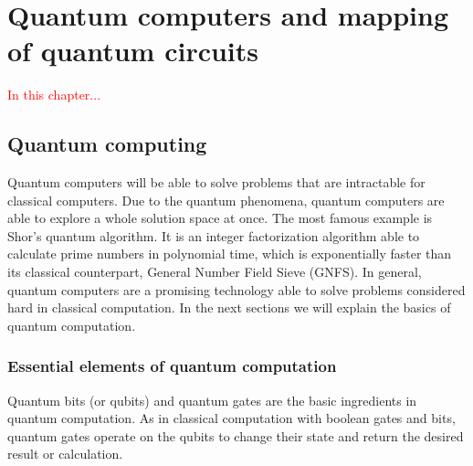 
\chapter{Quantum computers and mapping of quantum circuits}
\label{sec:org9b8733c}

\textcolor{red}{In this chapter...}


\section{Quantum computing}
\label{sec:org94895bc}

Quantum computers will be able to solve problems that are intractable for classical computers.
Due to the quantum phenomena, quantum computers are able to explore a whole solution space at once.
The most famous example is  Shor's quantum algorithm. It is an integer factorization algorithm able to calculate prime numbers in polynomial time, which is exponentially faster than its classical counterpart, General Number Field Sieve (GNFS). 
In general, quantum computers are a promising technology able to solve problems considered hard in classical computation.
In the next sections we will explain the basics of quantum computation.

\subsection{Essential elements of quantum computation}
\label{sec:orgba4af21}

Quantum bits (or qubits) and quantum gates are the basic ingredients in quantum computation.
As in classical computation with boolean gates and bits, quantum gates operate on the qubits to change their state and return the desired result or calculation.

